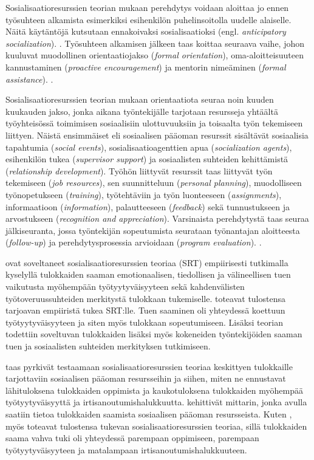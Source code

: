 \documentclass[utf8]{gradu3}
\begin{document}
Sosialisaatioresurssien teorian mukaan perehdytys voidaan aloittaa jo ennen työsuhteen alkamista esimerkiksi esihenkilön puhelinsoitolla uudelle alaiselle. Näitä käytäntöjä kutsutaan ennakoivaksi sosialisaatioksi (engl. \textit{anticipatory socialization}). \parencite{saks-gruman-2012}. Työsuhteen alkamisen jälkeen taas koittaa seuraava vaihe, johon kuuluvat muodollinen orientaatiojakso (\textit{formal orientation}), oma-aloitteisuuteen kannustaminen (\textit{proactive encouragement}) ja mentorin nimeäminen (\textit{formal assistance}). \parencite{saks-gruman-2012}.

Sosialisaatioresurssien teorian \parencite{saks-gruman-2012} mukaan orientaatiota seuraa noin kuuden kuukauden jakso, jonka aikana työntekijälle tarjotaan resursseja yhtäältä työyhteisössä toimimisen sosiaalisiin ulottuvuuksiin ja toisaalta työn tekemiseen liittyen. Näistä ensimmäiset eli sosiaalisen pääoman resurssit sisältävät sosiaalisia tapahtumia (\textit{social events}), sosialisaatioagenttien apua (\textit{socialization agents}), esihenkilön tukea (\textit{supervisor support}) ja sosiaalisten suhteiden kehittämistä (\textit{relationship development}). Työhön liittyvät resurssit taas liittyvät työn tekemiseen (\textit{job resources}), sen suunnitteluun (\textit{personal planning}), muodolliseen työnopetukseen (\textit{training}), työtehtäviin ja työn luonteeseen (\textit{assignments}), informaatioon (\textit{information}), palautteeseen (\textit{feedback}) sekä tunnustukseen ja arvostukseen (\textit{recognition and appreciation}). Varsinaista perehdytystä taas seuraa jälkiseuranta, jossa työntekijän sopeutumista seurataan työnantajan aloitteesta (\textit{follow-up}) ja perehdytysprosessia arvioidaan (\textit{program evaluation}). \parencite{saks-gruman-2012}.

\textcite{cranmer-ym-2016} ovat soveltaneet sosialisaatioresurssien teoriaa (SRT) empiirisesti tutkimalla kyselyllä tulokkaiden saaman emotionaalisen, tiedollisen ja välineellisen tuen vaikutusta myöhempään työtyytyväisyyteen sekä kahdenvälisten työtoveruussuhteiden merkitystä tulokkaan tukemiselle. \textcite{cranmer-ym-2016} toteavat tulostensa tarjoavan empiiristä tukea SRT:lle. Tuen saaminen oli yhteydessä koettuun työtyytyväisyyteen ja siten myös tulokkaan sopeutumiseen. Lisäksi teorian todettiin soveltuvan tulokkaiden lisäksi myös kokeneiden työntekijöiden saaman tuen ja sosiaalisten suhteiden merkityksen tutkimiseen. 

\textcite{harris-ym-2022} taas pyrkivät testaamaan sosialisaatioresurssien teoriaa keskittyen tulokkaille tarjottaviin sosiaalisen pääoman resursseihin ja siihen, miten ne ennustavat lähituloksena tulokkaiden oppimista ja kaukotuloksena tulokkaiden myöhempää työtyytyväisyyttä ja irtisanoutumishalukkuutta. \textcite{harris-ym-2022} kehittivät mittarin, jonka avulla saatiin tietoa tulokkaiden saamista sosiaalisen pääoman resursseista. Kuten \textcite{cranmer-ym-2016}, myös \textcite{harris-ym-2022} toteavat tulostensa tukevan sosialisaatioresurssien teoriaa, sillä tulokkaiden saama vahva tuki oli yhteydessä parempaan oppimiseen, parempaan työtyytyväisyyteen ja matalampaan irtisanoutumishalukkuuteen.
\end{document}

